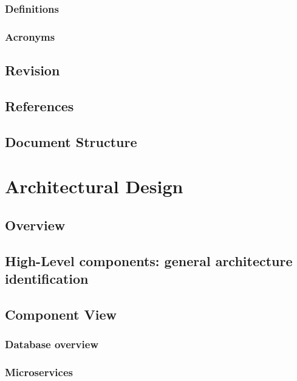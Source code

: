 \documentclass[12pt]{article}
\begin{document}
\subsubsection{Definitions}


\subsubsection{Acronyms}


\subsection{Revision}

\subsection{References}


\subsection{Document Structure}

\clearpage

\section{Architectural Design}

\subsection{Overview}

\subsection{High-Level components: general architecture identification}\label{higharch}

\subsection{Component View}\label{componentview}
\subsubsection{Database overview}

\subsubsection{Microservices}\label{microservices}

\clearpage
\end{document}
